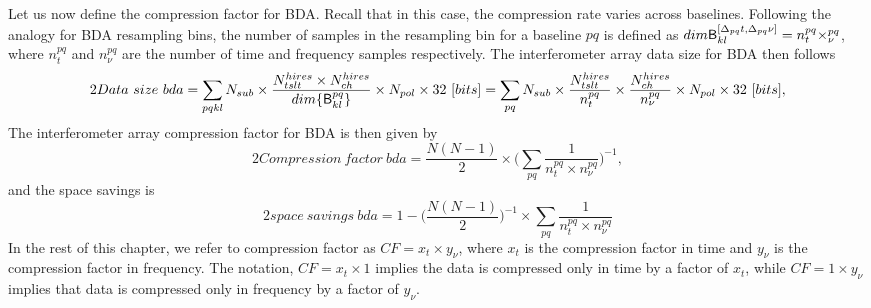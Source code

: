 \documentclass[useAMS,usenatbib]{mn2e}
\begin{document}
% 
Let us now define the compression factor for BDA. Recall that in this case, the compression rate
varies across baselines.  Following
the analogy for BDA resampling bins, the number of samples in the resampling bin for 
a baseline $pq$ is defined as $dim\mathsf{B}^{[\Delta_{pq} t, \Delta_{pq} \nu]}_{kl}=n_{t}^{pq}\times _{\nu}^{pq}$, where $n_{t}^{pq}$ and $n_{\nu}^{pq}$ are
the number of time and frequency samples respectively. The interferometer array data size for BDA then follows 
\begin{equation}{2}
 Data~size~bda =\sum_{pqkl} N_{sub}  \times \frac{N_{tslt}^{hires}\times N_{ch}^{hires}}{dim\{\mathsf{B}_{kl}^{pq}\}} \times N_{pol}\times 32 ~[bits]\\
	  =\sum_{pq} N_{sub}  \times \frac{N_{tslt}^{hires}}{n_{t}^{pq}} \times \frac{N_{ch}^{hires}}{n_{\nu}^{pq}}\times N_{pol}\times 32 ~[bits]
,\label{eq:memorychap4bd}
\end{equation}
The interferometer array compression factor for BDA is then given by
\begin{equation}{2}
Compression~factor~bda  =\frac{N(N-1)}{2}\times \Bigg(\sum_{pq} \frac{1}{n_t^{pq}\times n_{\nu}^{pq}}\Bigg)^{-1},\label{compresionbdafactor}
\end{equation} 
and the space savings is
\begin{equation}{2}
space~savings~bda   =1-\Bigg(\frac{N(N-1)}{2}\Bigg)^{-1}\times \sum_{pq} \frac{1}{n_t^{pq}\times n_{\nu}^{pq}}
\end{equation} 
In the rest of this chapter, we refer to compression factor as $CF=x_{t}\times y_{\nu}$, where $x_t$ is the compression factor in time 
and $y_{\nu}$ is the compression factor in frequency. The notation, $CF=x_{t}\times 1$ implies the data is 
compressed only in time by a factor of $x_{t}$, while $CF=1\times y_{\nu}$ implies that  data is  compressed only in frequency
 by a factor of $y_{\nu}$.
\end{document}
